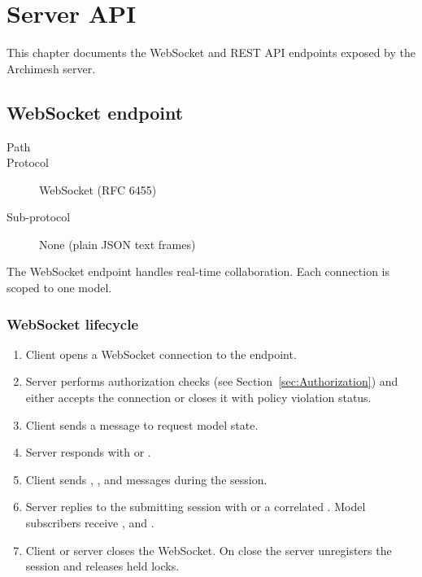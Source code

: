 \section{Server API}
\label{sec:ServerApi}

This chapter documents the WebSocket and REST API endpoints exposed by the
Archimesh server.

\subsection{WebSocket endpoint}

\begin{description}
\item[Path] 
\item[Protocol] WebSocket (RFC 6455)
\item[Sub-protocol] None (plain JSON text frames)
\end{description}

The WebSocket endpoint handles real-time collaboration. Each connection is
scoped to one model.

\subsubsection{WebSocket lifecycle}

\begin{enumerate}
\item Client opens a WebSocket connection to the endpoint.
\item Server performs authorization checks (see
  Section~\ref{sec:Authorization}) and either accepts the connection or
  closes it with policy violation status.
\item Client sends a  message to request model state.
\item Server responds with  or
  .
\item Client sends , ,
   and  messages during the session.
\item Server replies to the submitting session with 
  or a correlated . Model subscribers receive
  ,  and .
\item Client or server closes the WebSocket. On close the server unregisters
  the session and releases held locks.
\end{enumerate}

